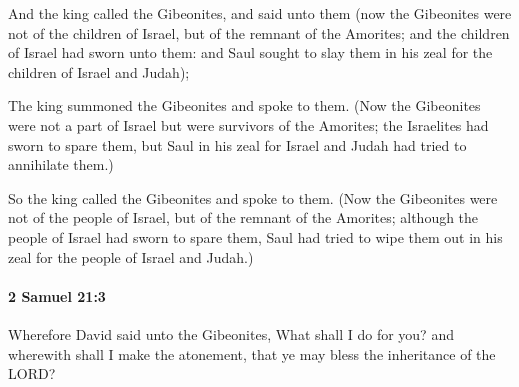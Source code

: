 			\begin{versebox}
					\item[BHS] 
					\item[ASV] And the king called the Gibeonites, and said unto them (now the Gibeonites were not of the children of Israel, but of the remnant of the Amorites; and the children of Israel had sworn unto them: and Saul sought to slay them in his zeal for the children of Israel and Judah);
					\item[NIV] The king summoned the Gibeonites and spoke to them. (Now the Gibeonites were not a part of Israel but were survivors of the Amorites; the Israelites had sworn to spare them, but Saul in his zeal for Israel and Judah had tried to annihilate them.)
					\item[NRSV] So the king called the Gibeonites and spoke to them. (Now the Gibeonites were not of the people of Israel, but of the remnant of the Amorites; although the people of Israel had sworn to spare them, Saul had tried to wipe them out in his zeal for the people of Israel and Judah.)
			\end{versebox}

		\paragraph{2 Samuel 21:3} %
			\label{2SAMUEL-21-3}

			Wherefore David said unto the Gibeonites, What shall I do for you? and wherewith shall I make the atonement, that ye may bless the inheritance of the LORD?

